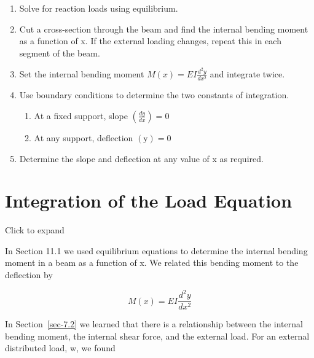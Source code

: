 \documentclass[
  letterpaper,
  DIV=11,
  numbers=noendperiod]{scrreprt}
\providecommand{\tightlist}{%
  \setlength{\itemsep}{0pt}\setlength{\parskip}{0pt}}\usepackage{longtable,booktabs,array}
\theoremstyle{definition}
\theoremstyle{remark}
\begin{document}
\begin{tcolorbox}[enhanced jigsaw, leftrule=.75mm, colbacktitle=quarto-callout-warning-color!10!white, breakable, opacityback=0, colback=white, titlerule=0mm, toprule=.15mm, colframe=quarto-callout-warning-color-frame, coltitle=black, title={Step-by-step: Deflection by Integration of Moment Equation}, toptitle=1mm, bottomrule=.15mm, rightrule=.15mm, left=2mm, arc=.35mm, opacitybacktitle=0.6, bottomtitle=1mm]

\begin{enumerate}
\def\labelenumi{\arabic{enumi}.}
\item
  Solve for reaction loads using equilibrium.
\item
  Cut a cross-section through the beam and find the internal bending
  moment as a function of x. If the external loading changes, repeat
  this in each segment of the beam.
\item
  Set the internal bending moment \(M(x)=E I \frac{d^{2} y}{d x^{2}}\)
  and integrate twice.
\item
  Use boundary conditions to determine the two constants of integration.

  \begin{enumerate}
  \def\labelenumii{\alph{enumii}.}
  \tightlist
  \item
    At a fixed support, slope \(\left(\frac{d y}{d x}\right)=0\)
  \item
    At any support, deflection \((\mathrm{y})=0\)
  \end{enumerate}
\item
  Determine the slope and deflection at any value of x as required.
\end{enumerate}

\end{tcolorbox}

\section{Integration of the Load Equation}\label{sec-11.2}

Click to expand

In Section 11.1 we used equilibrium equations to determine the internal
bending moment in a beam as a function of x. We related this bending
moment to the deflection by

\[
M(x)=E I \frac{d^{2} y}{d x^{2}}
\]

In Section~\ref{sec-7.2} we learned that there is a relationship between
the internal bending moment, the internal shear force, and the external
load. For an external distributed load, w, we found
\end{document}
